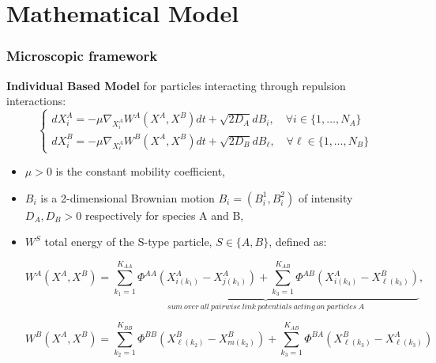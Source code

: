 \documentclass[10pt]{beamer}
\def \l {{\ell}}
\def \PAA {{\Phi^{AA}}}
\def \PBB {{\Phi^{BB}}}
\def \PAB {{\Phi^{AB}}}
\def \PBA {{\Phi^{BA}}}
\theoremstyle{remark}
\newcommand\Fontvii{\fontsize{9}{7.2}\selectfont}
\begin{document}
\section{Mathematical Model}
\begin{frame}
\frametitle{Microscopic framework}
\Fontvii

\textbf{Individual Based Model} for particles interacting through repulsion interactions:
\begin{equation}
	\begin{cases}
d X_i^{A}=-\mu \nabla_{X_{i}^{A}}W^{A}(X^{A},X^{B})dt + \sqrt{2D_{A}} d B_{i}, \quad \forall i \in\{1, \dots, N_{A}\}
\\
d X_i^{B}=-\mu \nabla_{X_{\l}^{A}}W^{B}(X^{A},X^{B})dt + \sqrt{2D_{B}} d B_{\ell}, \quad \forall \l \in \{1, \dots, N_{B}\}
\end{cases}
\end{equation}
\begin{itemize}
\item $\mu>0$ is the constant mobility coefficient, 
\item  $B_i$ is a 2-dimensional Brownian motion $B_i=(B_i^1,B_i^2)$ of intensity $D_A,D_B>0$ respectively for species A and B,
\item $W^S$ total energy of the S-type particle, $S \in \{ A,B \}$, defined as:  

 $$ W^{A}(X^{A},X^{B})=\underbrace{\sum_{k_1=1}^{K_{AA}} \PAA(X^{A}_{i(k_1)}-X^{A}_{j(k_1)})+
\sum_{k_3=1}^{K_{AB}} \PAB(X^{A}_{i(k_3)}-X^{B}_{\l(k_3)})}_{sum \ over \ all \ pairwise \ link \ potentials \ acting \ on \ particles \ A},  $$

$$ W^{B}(X^{A},X^{B})=\sum_{k_2=1}^{K_{BB}} \PBB(X^{B}_{\l(k_2)}-X^{B}_{m(k_2)})+
\sum_{k_3=1}^{K_{AB}} \PBA(X^{B}_{\l(k_3)}-X^{A}_{\l(k_3)}) $$

\end{itemize}
\end{frame}
\end{document}
